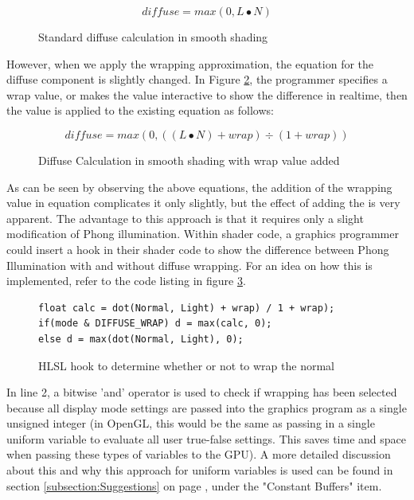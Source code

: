 \documentclass[a4paper, 12pt]{article}
\begin{document}
\begin{figure}[h]
\[diffuse = max(0, L \bullet N)\]
\caption{Standard diffuse calculation in smooth shading}
\label{equation:diffuse}
\end{figure}

\noindent However, when we apply the wrapping approximation, the equation for
the diffuse component is slightly changed. In Figure \ref{equation:wrap}, the
programmer specifies a wrap value, or makes the value interactive to show the
difference in realtime, then the value is applied to the existing equation as
follows:

\begin{figure}[h]
\[diffuse = max(0,((L\bullet N) + wrap) \div (1 + wrap))\]
\caption{Diffuse Calculation in smooth shading with wrap value added}
\label{equation:wrap}
\end{figure}


\noindent As can be seen by observing the above equations, the addition of the
wrapping value in equation complicates it only slightly, but the effect of
adding the is very apparent. The advantage to this approach is that it
requires only a slight modification of Phong illumination. Within shader code,
a graphics programmer could insert a hook in their shader code to show the
difference between Phong Illumination with and without diffuse wrapping. For
an idea on how this is implemented, refer to the code listing in figure
\ref{code:WrapExample}.

\begin{figure}[h]
\begin{lstlisting}[breaklines, language=HLSL]
float calc = dot(Normal, Light) + wrap) / 1 + wrap);
if(mode & DIFFUSE_WRAP) d = max(calc, 0);
else d = max(dot(Normal, Light), 0);
\end{lstlisting}

\caption{HLSL hook to determine whether or not to wrap the normal}
\label{code:WrapExample}
\end{figure}

\noindent In line 2, a bitwise 'and' operator is used to check if wrapping has
been selected because all display mode settings are passed into the graphics
program as a single unsigned integer (in OpenGL, this would be the same as
passing in a single uniform variable to evaluate all user true-false settings.
This saves time and space when passing these types of variables to the GPU). A
more detailed discussion about this and why this approach for uniform
variables is used can be found in section \ref{subsection:Suggestions} on
page \pageref{subsection:Suggestions}, under the "Constant Buffers" item.
\end{document}
